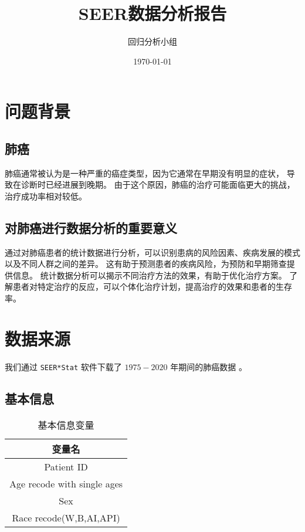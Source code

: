\documentclass{ctexart}
\title{SEER数据分析报告}
\author{回归分析小组}
\date{\today}
\begin{document}
    \maketitle
    \thispagestyle{empty}
    \newpage

    \tableofcontents
    \thispagestyle{empty}
    \newpage

    \setcounter{page}{1}
    \section{问题背景}
        \subsection{肺癌}
            肺癌通常被认为是一种严重的癌症类型，因为它通常在早期没有明显的症状，
            导致在诊断时已经进展到晚期。
            由于这个原因，肺癌的治疗可能面临更大的挑战，治疗成功率相对较低。
        \subsection{对肺癌进行数据分析的重要意义}
            通过对肺癌患者的统计数据进行分析，可以识别患病的风险因素、疾病发展的模式以及不同人群之间的差异。
            这有助于预测患者的疾病风险，为预防和早期筛查提供信息。
            统计数据分析可以揭示不同治疗方法的效果，有助于优化治疗方案。
            了解患者对特定治疗的反应，可以个体化治疗计划，提高治疗的效果和患者的生存率。

    \section{数据来源}
        我们通过 \texttt{SEER*Stat} 软件下载了 $1975-2020$ 年期间的肺癌数据 \cite{seer2023}。
        \subsection{基本信息}
        \begin{table}[htbp]
            \centering
            \begin{tabular}{c}
                \hline
                变量名 \\
                \hline
                Patient ID \\
                Age recode with single ages \\
                Sex \\
                Race recode(W,B,AI,API) \\
                \hline
            \end{tabular}
            \caption{基本信息变量}
            \label{tab:basic-information}
        \end{table}
        
\end{document}
